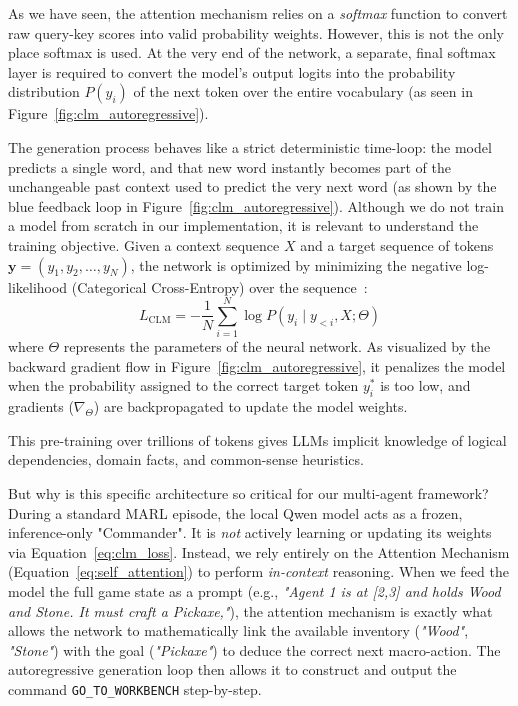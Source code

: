 As we have seen, the attention mechanism relies on a \emph{softmax} function to convert raw query-key scores into valid probability weights. However, this is not the only place softmax is used. At the very end of the network, a separate, final softmax layer is required to convert the model's output logits into the probability distribution $P(y_i)$ of the next token over the entire vocabulary (as seen in Figure~\ref{fig:clm_autoregressive}).

The generation process behaves like a strict deterministic time-loop: the model predicts a single word, and that new word instantly becomes part of the unchangeable past context used to predict the very next word (as shown by the blue feedback loop in Figure~\ref{fig:clm_autoregressive}). Although we do not train a model from scratch in our implementation, it is relevant to understand the training objective. Given a context sequence $X$ and a target sequence of tokens $\mathbf{y} = (y_1, y_2, \dots, y_N)$, the network is optimized by minimizing the negative log-likelihood (Categorical Cross-Entropy) over the sequence~\parencite{Radford_Narasimhan_Salimans_Sutskever_2018}:
\begin{equation}
\label{eq:clm_loss}
    L_{\text{CLM}} = -\frac{1}{N} \sum_{i=1}^{N} \log P(y_i \mid y_{<i}, X; \Theta)
\end{equation}
where $\Theta$ represents the parameters of the neural network. As visualized by the backward gradient flow in Figure~\ref{fig:clm_autoregressive}, it penalizes the model when the probability assigned to the correct target token $y^*_i$ is too low, and gradients ($\nabla_\Theta$) are backpropagated to update the model weights.

This pre-training over trillions of tokens gives LLMs implicit knowledge of logical dependencies, domain facts, and common-sense heuristics. 

But why is this specific architecture so critical for our multi-agent framework? During a standard MARL episode, the local Qwen model acts as a frozen, inference-only "Commander". It is \emph{not} actively learning or updating its weights via Equation~\ref{eq:clm_loss}. Instead, we rely entirely on the Attention Mechanism (Equation~\ref{eq:self_attention}) to perform \emph{in-context} reasoning. When we feed the model the full game state as a prompt (e.g., \emph{"Agent 1 is at [2,3] and holds Wood and Stone. It must craft a Pickaxe,"}), the attention mechanism is exactly what allows the network to mathematically link the available inventory (\emph{"Wood"}, \emph{"Stone"}) with the goal (\emph{"Pickaxe"}) to deduce the correct next macro-action. The autoregressive generation loop then allows it to construct and output the command \texttt{GO\_TO\_WORKBENCH} step-by-step. 

